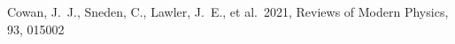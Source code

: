 \documentclass[twocolumn, twocolappendix]{aastex63}
\begin{document}
\begin{thebibliography}{}


























 Cowan, J.~J., Sneden, C., Lawler, J.~E., et al.\ 2021, Reviews of Modern Physics, 93, 015002





\end{thebibliography}
\end{document}

